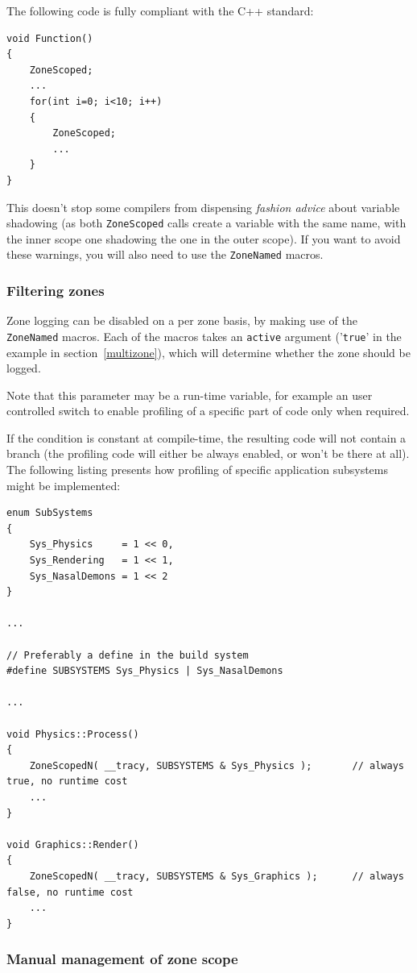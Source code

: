 \documentclass[hidelinks,titlepage,a4paper]{article}
\begin{document}
The following code is fully compliant with the C++ standard:

\begin{lstlisting}
void Function()
{
	ZoneScoped;
	...
	for(int i=0; i<10; i++)
	{
		ZoneScoped;
		...
	}
}
\end{lstlisting}

This doesn't stop some compilers from dispensing \emph{fashion advice} about variable shadowing (as both \texttt{ZoneScoped} calls create a variable with the same name, with the inner scope one shadowing the one in the outer scope). If you want to avoid these warnings, you will also need to use the \texttt{ZoneNamed} macros.

\subsubsection{Filtering zones}
\label{filteringzones}

Zone logging can be disabled on a per zone basis, by making use of the \texttt{ZoneNamed} macros. Each of the macros takes an \texttt{active} argument ('\texttt{true}' in the example in section~\ref{multizone}), which will determine whether the zone should be logged.

Note that this parameter may be a run-time variable, for example an user controlled switch to enable profiling of a specific part of code only when required.

If the condition is constant at compile-time, the resulting code will not contain a branch (the profiling code will either be always enabled, or won't be there at all). The following listing presents how profiling of specific application subsystems might be implemented:

\begin{lstlisting}
enum SubSystems
{
	Sys_Physics		= 1 << 0,
	Sys_Rendering	= 1 << 1,
	Sys_NasalDemons	= 1 << 2
}

...

// Preferably a define in the build system
#define SUBSYSTEMS Sys_Physics | Sys_NasalDemons

...

void Physics::Process()
{
	ZoneScopedN( __tracy, SUBSYSTEMS & Sys_Physics );		// always true, no runtime cost
	...
}

void Graphics::Render()
{
	ZoneScopedN( __tracy, SUBSYSTEMS & Sys_Graphics );		// always false, no runtime cost
	...
}
\end{lstlisting}

\subsubsection{Manual management of zone scope}
\end{document}
